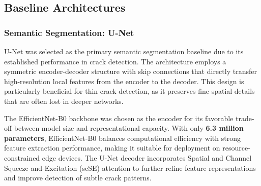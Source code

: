 \begin{table}[h]
    \centering
    \caption{Comparison of selected model architectures.}
    \label{tab:model_comparison}
    \renewcommand{\arraystretch}{1.2}
\end{table}

\subsection{Baseline Architectures}

\subsubsection{Semantic Segmentation: U-Net}

\hs U-Net was selected as the primary semantic segmentation baseline due to its established performance in crack detection. The architecture employs a symmetric encoder-decoder structure with skip connections that directly transfer high-resolution local features from the encoder to the decoder. This design is particularly beneficial for thin crack detection, as it preserves fine spatial details that are often lost in deeper networks.

\begin{sloppypar}
    \hs The EfficientNet-B0 backbone was chosen as the encoder for its favorable trade-off between model size and representational capacity. With only \textbf{6.3 million parameters}, EfficientNet-B0 balances computational efficiency with strong feature extraction performance, making it suitable for deployment on resource-constrained edge devices. The U-Net decoder incorporates Spatial and Channel Squeeze-and-Excitation (scSE) attention to further refine feature representations and improve detection of subtle crack patterns.
\end{sloppypar}

